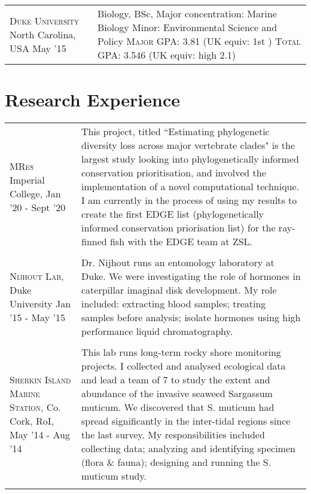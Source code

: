 \documentclass[a4paper,10pt]{article} %
\begin{document}
{\begin{tabular}{ L{4cm} L{15cm} }
	\textsc{Duke University} \newline North Carolina, USA \newline May '15 & 	Biology, BSc,  Major concentration: Marine Biology \newline 
	Minor: Environmental Science and Policy \newline
	\textsc{Major GPA: } 3.81 (UK equiv: 1st ) \newline
	\textsc{Total GPA: } 3.546  (UK equiv: high 2.1)\newline
	
\end{tabular}




\section{Research Experience}


\begin{tabular}{ L{4cm} L{14cm} }
	\textsc{MRes} Imperial College, Jan '20 - Sept '20 & 
	 This project, titled ``Estimating phylogenetic diversity loss across major vertebrate clades" is the largest study looking into phylogenetically informed conservation prioritisation, and involved the implementation of a novel computational technique. I am currently in the process of using my results to create the first EDGE list (phylogenetically informed conservation priorisation list) for the ray-finned fish with the EDGE team at ZSL. \\&\\
	
	\textsc{Nijhout Lab}, \newline Duke University \newline Jan '15 - May '15 & Dr. Nijhout runs an entomology laboratory at Duke. We were investigating the role of hormones in caterpillar imaginal disk development. My role included: extracting blood samples; treating samples before analysis; isolate hormones using high performance liquid chromatography. \\&\\
	
	\textsc{Sherkin Island Marine Station}, \newline Co. Cork, RoI, \newline May '14 - Aug '14 & 
	This lab runs long-term rocky shore monitoring projects. I collected and analysed ecological data and lead a team of 7 to study the extent and abundance of the invasive seaweed Sargassum muticum. We discovered that S. muticum had spread significantly in the inter-tidal regions since the last survey. My responsibilities included collecting data; analyzing and identifying specimen (flora \& fauna); designing and running the S. muticum study. \\&\\
	

\end{tabular}}
\end{document}
